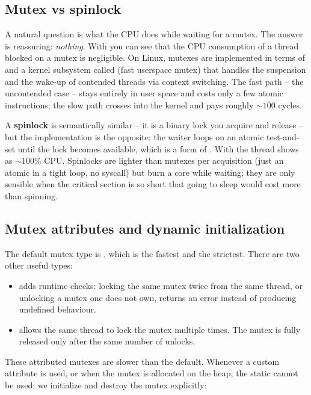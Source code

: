 \subsection{Mutex vs spinlock}

A natural question is what the CPU does while waiting for a mutex. The answer is reassuring: \emph{nothing}. With  you can see that the CPU consumption of a thread blocked on a mutex is negligible. On Linux, mutexes are implemented in terms of  and a kernel subsystem called  (fast userspace mutex) that handles the suspension and the wake-up of contended threads via context switching. The fast path -- the uncontended case -- stays entirely in user space and costs only a few atomic instructions; the slow path crosses into the kernel and pays roughly $\sim 100$ cycles.

A \textbf{spinlock} is semantically similar -- it is a binary lock you acquire and release -- but the implementation is the opposite: the waiter loops on an atomic test-and-set until the lock becomes available, which is a form of . With  the thread shows as $\sim 100\%$ CPU. Spinlocks are lighter than mutexes per acquisition (just an atomic in a tight loop, no syscall) but burn a core while waiting; they are only sensible when the critical section is so short that going to sleep would cost more than spinning.

\subsection{Mutex attributes and dynamic initialization}

The default mutex type is , which is the fastest and the strictest. There are two other useful types:

\begin{itemize}[noitemsep]
    \item {} adds runtime checks: locking the same mutex twice from the same thread, or unlocking a mutex one does not own, returns an error instead of producing undefined behaviour.
    \item {} allows the same thread to lock the mutex multiple times. The mutex is fully released only after the same number of unlocks.
\end{itemize}

These attributed mutexes are slower than the default. Whenever a custom attribute is used, or when the mutex is allocated on the heap, the static  cannot be used; we initialize and destroy the mutex explicitly:

